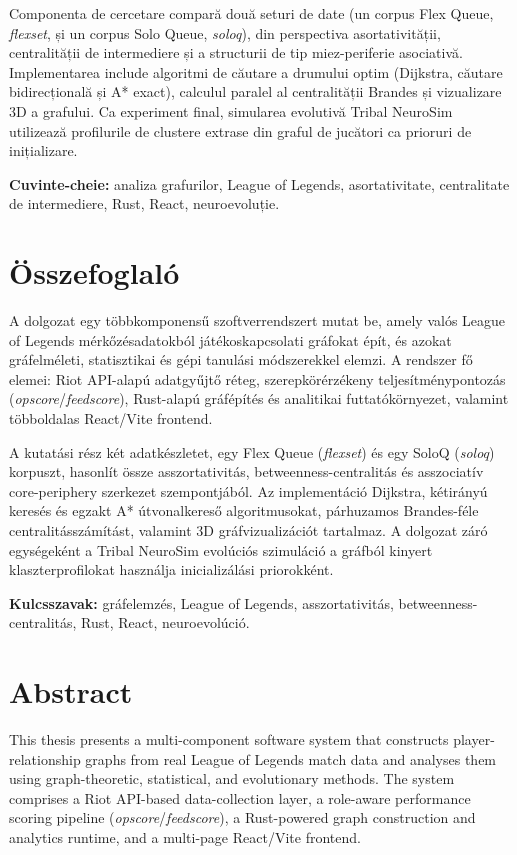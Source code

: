 Componenta de cercetare compară două seturi de date (un corpus Flex Queue,
\textit{flexset}, și un corpus Solo Queue, \textit{soloq}), din perspectiva
asortativității, centralității de intermediere și a structurii de tip miez-periferie
asociativă. Implementarea include algoritmi de căutare a drumului optim (Dijkstra,
căutare bidirecțională și A* exact), calculul paralel al centralității Brandes și
vizualizare 3D a grafului. Ca experiment final, simularea evolutivă Tribal NeuroSim
utilizează profilurile de clustere extrase din graful de jucători ca prioruri de
inițializare.

\textbf{Cuvinte-cheie:} analiza grafurilor, League of Legends, asortativitate,
centralitate de intermediere, Rust, React, neuroevoluție.

\newpage
\chapter*{Összefoglaló}
\thispagestyle{empty}

A dolgozat egy többkomponensű szoftverrendszert mutat be, amely valós League of Legends
mérkőzésadatokból játékoskapcsolati gráfokat épít, és azokat gráfelméleti, statisztikai és
gépi tanulási módszerekkel elemzi. A rendszer fő elemei: Riot API-alapú adatgyűjtő réteg,
szerepkörérzékeny teljesítménypontozás (\textit{opscore}/\textit{feedscore}),
Rust-alapú gráfépítés és analitikai futtatókörnyezet, valamint többoldalas React/Vite frontend.

A kutatási rész két adatkészletet, egy Flex Queue (\textit{flexset}) és egy SoloQ
(\textit{soloq}) korpuszt, hasonlít össze asszortativitás, betweenness-centralitás és
asszociatív core-periphery szerkezet szempontjából. Az implementáció Dijkstra, kétirányú
keresés és egzakt A* útvonalkereső algoritmusokat, párhuzamos Brandes-féle centralitásszámítást,
valamint 3D gráfvizualizációt tartalmaz. A dolgozat záró egységeként a Tribal NeuroSim
evolúciós szimuláció a gráfból kinyert klaszterprofilokat használja inicializálási priorokként.

\textbf{Kulcsszavak:} gráfelemzés, League of Legends, asszortativitás, betweenness-centralitás,
Rust, React, neuroevolúció.

\newpage
\chapter*{Abstract}
\thispagestyle{empty}

This thesis presents a multi-component software system that constructs player-relationship
graphs from real League of Legends match data and analyses them using graph-theoretic,
statistical, and evolutionary methods. The system comprises a Riot API-based data-collection
layer, a role-aware performance scoring pipeline (\textit{opscore}/\textit{feedscore}), a
Rust-powered graph construction and analytics runtime, and a multi-page React/Vite frontend.

